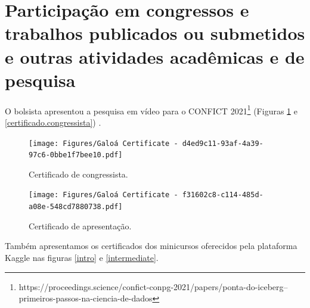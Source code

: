 \documentclass{article}
\begin{document}
\section{Participação em congressos e trabalhos publicados ou submetidos e outras
atividades acadêmicas e de pesquisa}
O bolsista apresentou a pesquisa em vídeo para o CONFICT 2021\footnote{https://proceedings.science/confict-conpg-2021/papers/ponta-do-iceberg--primeiros-passos-na-ciencia-de-dados} (Figuras \ref{certificado.apresentacao} e \ref{certificado.congressista}) \cite{videoCONFICT}. 

\begin{figure}[h!tbp]
  \centering
  \begin{minipage}[b]{0.7\textwidth}
    \texttt{[image: Figures/Galoá Certificate - d4ed9c11-93af-4a39-97c6-0bbe1f7bee10.pdf]}
    \caption{\label{certificado.congressista} Certificado de congressista.}
  \end{minipage}
  \hfill
  \begin{minipage}[b]{0.7\textwidth}
    \texttt{[image: Figures/Galoá Certificate - f31602c8-c114-485d-a08e-548cd7880738.pdf]}
    \caption{\label{certificado.apresentacao} Certificado de apresentação.}
  \end{minipage}
\end{figure}

Também apresentamos os certificados dos minicursos oferecidos pela plataforma Kaggle nas figuras \ref{intro} e \ref{intermediate}.
\end{document}
